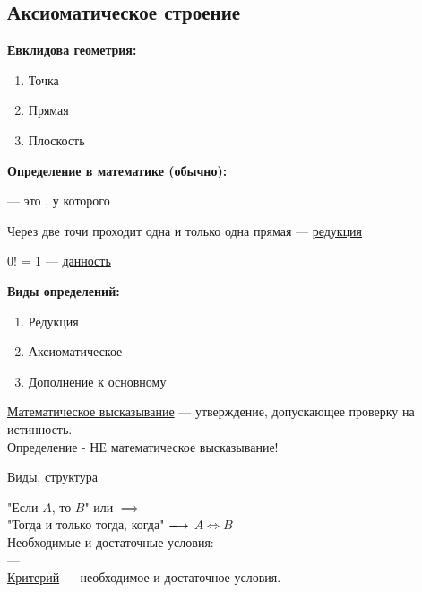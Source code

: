 \subsection{%
  Аксиоматическое строение%
}
\textbf{Евклидова геометрия:}
\smallskip
	\begin{enumerate}
		\item Точка
		\item Прямая
		\item Плоскость
	\end{enumerate}
\bigskip
\textbf{Определение в математике (обычно):}
\smallskip
\begin{example}[1]

	— это
	, у которого
\end{example}
\smallskip
\begin{example}[2]
	\hspace{2mm}Через две точи проходит одна и только одна прямая — \underline{редукция}
\end{example}
\smallskip
\begin{example}[3]
	\hspace{2mm}0! = 1 — \underline{данность}
\end{example}
\medskip
\textbf{Виды определений:}
\begin{enumerate}[topsep=5pt]
	\item Редукция
    \item Аксиоматическое
    \item Дополнение к основному
\end{enumerate}
\smallskip
\begin{nota}
	\underline{Математическое высказывание} — утверждение, допускающее проверку на истинность.\\
	Определение - НЕ математическое высказывание!
\end{nota}
\medskip
\begin{theorem}
Виды, структура
\end{theorem}
\smallskip
"Если $A$, то $B$" \hspace{2mm} или
$\implies$
\\[2mm]
"Тогда и только тогда, когда" \hspace{0.1mm} $\Rarr{}$ $A \Leftrightarrow B$\\[3mm]
Необходимые и достаточные условия:\\[1mm]
 —
\\[2mm]
\underline{Критерий} — необходимое и достаточное условия.

